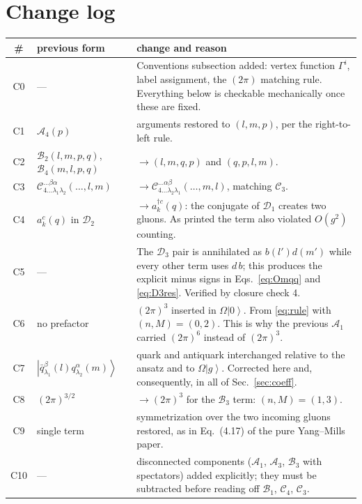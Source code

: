 \documentclass[11pt]{article}
\newcommand{\dg}{\dagger}
\newcommand{\ket}[1]{\left|#1\right\rangle}
\newcommand{\vac}{\ket{0}}
\newcommand{\OM}{\Omega}
\newcommand{\Gam}{\Gamma}
\newcommand{\qk}[3]{q^{#1}_{#2}(#3)}
\newcommand{\aqk}[3]{\bar q^{#1}_{#2}(#3)}
\newcommand{\A}{\mathcal{A}}
\newcommand{\B}{\mathcal{B}}
\newcommand{\C}{\mathcal{C}}
\newcommand{\D}{\mathcal{D}}
\begin{document}
\section{Change log}
\label{app:changelog}

\begin{center}
\renewcommand{\arraystretch}{1.15}\small
\begin{longtable}{c>{\raggedright\arraybackslash}p{3.9cm}p{7.6cm}}
\hline
\# & previous form & change and reason\\
\hline
\endhead
C0 & --- & Conventions subsection added: vertex function $\Gam^{i}$, label assignment, the
$(2\pi)$ matching rule. Everything below is checkable mechanically once these are fixed.\\
C1 & $\A_{4}(p)$ & arguments restored to $(l,m,p)$, per the right-to-left rule.\\
C2 & $\B_{2}(l,m,p,q)$, $\B_{4}(m,l,p,q)$ & $\to(l,m,q,p)$ and $(q,p,l,m)$.\\
C3 & $\C^{\ldots\beta\alpha}_{4\ldots\lambda_{1}\lambda_{2}}(\ldots,l,m)$ &
$\to\C^{\ldots\alpha\beta}_{4\ldots\lambda_{2}\lambda_{1}}(\ldots,m,l)$, matching $\C_{3}$.\\
C4 & $a^{c}_{k}(q)$ in $\D_{2}$ & $\to a^{\dg c}_{k}(q)$: the conjugate of $\D_{1}$ creates two
gluons. As printed the term also violated $O(g^{2})$ counting.\\
C5 & --- & The $\D_{3}$ pair is annihilated as $b(l')d(m')$ while every other term uses $d\,b$;
this produces the explicit minus signs in Eqs.~\eqref{eq:Omqq} and \eqref{eq:D3res}.
Verified by closure check 4.\\
C6 & no prefactor & $(2\pi)^{3}$ inserted in $\OM\vac$. From \eqref{eq:rule} with $(n,M)=(0,2)$.
This is why the previous $\A_{1}$ carried $(2\pi)^{6}$ instead of $(2\pi)^{3}$.\\
C7 & $\ket{\aqk{\beta}{\lambda_{1}}{l}\qk{\alpha}{\lambda_{2}}{m}}$ & quark and antiquark
interchanged relative to the ansatz and to $\OM\ket{g}$. Corrected here and, consequently, in all
of Sec.~\ref{sec:coeff}.\\
C8 & $(2\pi)^{3/2}$ & $\to(2\pi)^{3}$ for the $\B_{3}$ term: $(n,M)=(1,3)$.\\
C9 & single term & symmetrization over the two incoming gluons restored, as in Eq.~(4.17) of the
pure Yang--Mills paper.\\
C10 & --- & disconnected components ($\A_{1}$, $\A_{3}$, $\B_{3}$ with spectators) added
explicitly; they must be subtracted before reading off $\B_{1}$, $\C_{4}$, $\C_{3}$.\\

\end{longtable}
\end{center}
\end{document}
